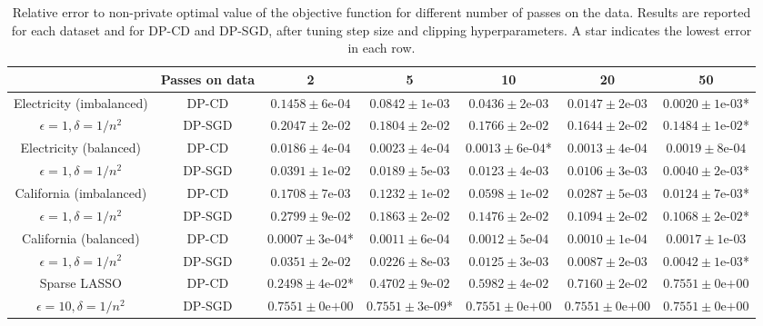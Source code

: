 \begin{table}[t]
  \centering
  \scriptsize

  \caption{
    Relative error to non-private optimal value of the
    objective function for different number of passes on the
    data. Results are reported for each dataset and for DP-CD and
    DP-SGD, after tuning step size and clipping
    hyperparameters. A star indicates the lowest error in each row.
  }

  \label{tab:full-tuning-max-iter}
  \begin{tabular}{ccccccc}
    \toprule
    & Passes on data &2  	 &5  	 &10  	 &20  	 &50  	 \\
    \midrule
    Electricity (imbalanced) & DP-CD  & $ 0.1458 \pm 6\text{e-}04 $ 	 & $ 0.0842 \pm 1\text{e-}03 $ 	 & $ 0.0436 \pm 2\text{e-}03 $ 	 & $ 0.0147 \pm 2\text{e-}03 $ 	 & $ 0.0020 \pm 1\text{e-}03 $* 	 \\
    $\epsilon=1, \delta=1/n^2$ & DP-SGD  & $ 0.2047 \pm 2\text{e-}02 $ 	 & $ 0.1804 \pm 2\text{e-}02 $ 	 & $ 0.1766 \pm 2\text{e-}02 $ 	 & $ 0.1644 \pm 2\text{e-}02 $ 	 & $ 0.1484 \pm 1\text{e-}02 $* 	 \\
    \midrule
    Electricity (balanced) & DP-CD  & $ 0.0186 \pm 4\text{e-}04 $ 	 & $ 0.0023 \pm 4\text{e-}04 $ 	 & $ 0.0013 \pm 6\text{e-}04 $* 	 & $ 0.0013 \pm 4\text{e-}04 $ 	 & $ 0.0019 \pm 8\text{e-}04 $ 	 \\
    $\epsilon=1, \delta=1/n^2$ & DP-SGD  & $ 0.0391 \pm 1\text{e-}02 $ 	 & $ 0.0189 \pm 5\text{e-}03 $ 	 & $ 0.0123 \pm 4\text{e-}03 $ 	 & $ 0.0106 \pm 3\text{e-}03 $ 	 & $ 0.0040 \pm 2\text{e-}03 $* 	 \\
    \midrule
    California (imbalanced) & DP-CD  & $ 0.1708 \pm 7\text{e-}03 $ 	 & $ 0.1232 \pm 1\text{e-}02 $ 	 & $ 0.0598 \pm 1\text{e-}02 $ 	 & $ 0.0287 \pm 5\text{e-}03 $ 	 & $ 0.0124 \pm 7\text{e-}03 $* 	 \\
    $\epsilon=1, \delta=1/n^2$ & DP-SGD  & $ 0.2799 \pm 9\text{e-}02 $ 	 & $ 0.1863 \pm 2\text{e-}02 $ 	 & $ 0.1476 \pm 2\text{e-}02 $ 	 & $ 0.1094 \pm 2\text{e-}02 $ 	 & $ 0.1068 \pm 2\text{e-}02 $* 	 \\
    \midrule
    California (balanced) & DP-CD  & $ 0.0007 \pm 3\text{e-}04 $* 	 & $ 0.0011 \pm 6\text{e-}04 $ 	 & $ 0.0012 \pm 5\text{e-}04 $ 	 & $ 0.0010 \pm 1\text{e-}04 $ 	 & $ 0.0017 \pm 1\text{e-}03 $ 	 \\
    $\epsilon=1, \delta=1/n^2$ & DP-SGD  & $ 0.0351 \pm 2\text{e-}02 $ 	 & $ 0.0226 \pm 8\text{e-}03 $ 	 & $ 0.0125 \pm 3\text{e-}03 $ 	 & $ 0.0087 \pm 2\text{e-}03 $ 	 & $ 0.0042 \pm 1\text{e-}03 $* 	 \\
    \midrule
    Sparse LASSO & DP-CD  & $ 0.2498 \pm 4\text{e-}02 $* 	 & $ 0.4702 \pm 9\text{e-}02 $ 	 & $ 0.5982 \pm 4\text{e-}02 $ 	 & $ 0.7160 \pm 2\text{e-}02 $ 	 & $ 0.7551 \pm 0\text{e+}00 $ 	 \\
    $\epsilon=10, \delta=1/n^2$ & DP-SGD  & $ 0.7551 \pm 0\text{e+}00 $ 	 & $ 0.7551 \pm 3\text{e-}09 $* 	 & $ 0.7551 \pm 0\text{e+}00 $ 	 & $ 0.7551 \pm 0\text{e+}00 $ 	 & $ 0.7551 \pm 0\text{e+}00 $ 	 \\
    \bottomrule




\end{tabular}
\end{table}
